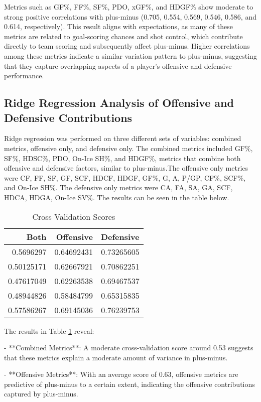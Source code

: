\documentclass[12pt]{article}
\begin{document}
Metrics such as GF\%, FF\%, SF\%, PDO, xGF\%, and HDGF\% show moderate to strong positive correlations with plus-minus (0.705, 0.554, 
0.569, 0.546, 0.586, and 0.614, respectively). This result aligns with expectations, as many of these metrics are related to goal-scoring 
chances and shot control, which contribute directly to team scoring and subsequently affect plus-minus. Higher correlations among these 
metrics indicate a similar variation pattern to plus-minus, suggesting that they capture overlapping aspects of a player's offensive and 
defensive performance.

\subsection{Ridge Regression Analysis of Offensive and Defensive Contributions}

Ridge regression was performed on three different sets of variables: combined metrics, offensive only, and defensive only. The combined 
metrics included GF\%, SF\%, HDSC\%, PDO, On-Ice SH\%, and HDGF\%, metrics that combine both offensive and defensive factors, similar to 
plus-minus.The offensive only metrics were CF, FF, SF, GF, SCF, HDCF, HDGF, GF\%, G, A, P/GP, CF\%, SCF\%, and On-Ice SH\%. The defensive 
only metrics were CA, FA, SA, GA, SCF, HDCA, HDGA, On-Ice SV\%. The results can be seen in the table below.

\begin{table}[tbp]
  \caption{Cross Validation Scores}
  \label{tab:rv}
\centering
\begin{tabular}{rrr}
  \toprule
Both & Offensive & Defensive \\ 
  \midrule
  0.5696297 & 0.64692431 & 0.73265605 \\ 
  0.50125171 & 0.62667921 & 0.70862251 \\ 
  0.47617049 & 0.62263538 & 0.69467537 \\ 
  0.48944826 & 0.58484799 & 0.65315835 \\ 
  0.57586267 & 0.69145036 & 0.76239753 \\ 
  \bottomrule
\end{tabular}
\end{table}

The results in Table \ref{tab:rv} reveal:

- **Combined Metrics**: A moderate cross-validation score around 0.53 suggests that these metrics explain a moderate amount of variance 
in plus-minus.

- **Offensive Metrics**: With an average score of 0.63, offensive metrics are predictive of plus-minus to a certain extent, indicating 
the offensive contributions captured by plus-minus.
\end{document}
